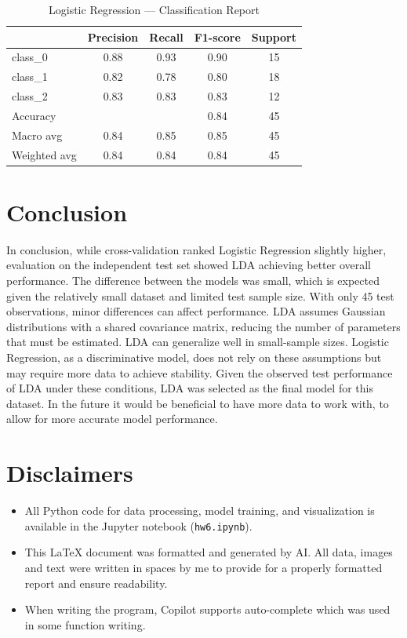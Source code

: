\documentclass[12pt]{article}
\begin{document}
\begin{itemize}
\begin{table}[h!]
\centering

\begin{tabular}{lcccc}
\hline
              & Precision & Recall & F1-score & Support \\
\hline
class\_0      & 0.88      & 0.93   & 0.90     & 15      \\
class\_1      & 0.82      & 0.78   & 0.80     & 18      \\
class\_2      & 0.83      & 0.83   & 0.83     & 12      \\
\hline
Accuracy      &           &        & 0.84     & 45      \\
Macro avg     & 0.84      & 0.85   & 0.85     & 45      \\
Weighted avg  & 0.84      & 0.84   & 0.84     & 45      \\
\hline
\end{tabular}
\caption{Logistic Regression --- Classification Report}
\end{table}
\end{itemize}

\section{Conclusion}

 In conclusion, while cross-validation ranked Logistic Regression slightly higher, evaluation on the independent test set showed LDA achieving better overall performance. The difference between the models was small, which is expected given the relatively small dataset and limited test sample size. With only 45 test observations, minor differences can affect performance. LDA assumes Gaussian distributions with a shared covariance matrix, reducing the number of parameters that must be estimated. LDA can generalize well in small-sample sizes. Logistic Regression, as a discriminative model, does not rely on these assumptions but may require more data to achieve stability. Given the observed test performance of LDA under these conditions, LDA was selected as the final model for this dataset. In the future it would be beneficial to have more data to work with, to allow for more accurate model performance.

\section{Disclaimers}
\begin{itemize}
    \item All Python code for data processing, model training, and visualization is available in the Jupyter notebook (\texttt{hw6.ipynb}).
    
\item This LaTeX document was formatted and generated by AI. All data, images and text were written in spaces by me to provide for a properly formatted report and ensure readability.

\item When writing the program, Copilot supports auto-complete which was used in some function writing.
\end{itemize}
\end{document}
